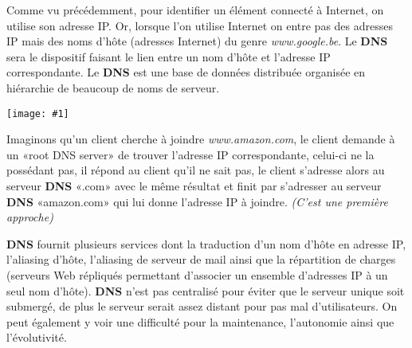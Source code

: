 \documentclass{article}
\newcommand{\imgR}[2]{\begin{center}\texttt{[image: \#1]}\end{center}}
\begin{document}
Comme vu précédemment, pour identifier un élément connecté à Internet, on utilise son adresse IP. Or, lorsque 
l'on utilise Internet on entre pas des adresses IP mais des noms d'hôte (adresses Internet) du genre 
\textit{www.google.be}. Le \textbf{DNS} sera le dispositif faisant le lien entre un nom d'hôte et l'adresse IP
correspondante. Le \textbf{DNS} est une base de données distribuée organisée en hiérarchie de beaucoup de noms
de serveur.

\imgR{CN_020.png}{300}

\noindent Imaginons qu'un client cherche à joindre \textit{www.amazon.com}, le client demande à un «root DNS 
server» de trouver l'adresse IP correspondante, celui-ci ne la possédant pas, il répond au client qu'il ne sait 
pas, le client s'adresse alors au serveur \textbf{DNS} «.com» avec le même résultat et finit par s'adresser au 
serveur \textbf{DNS} «amazon.com» qui lui donne l'adresse IP à joindre. \textit{(C'est une première approche)}

\textbf{DNS} fournit plusieurs services dont la traduction d'un nom d'hôte en adresse IP, l'aliasing d'hôte, 
l'aliasing de serveur de mail ainsi que la répartition de charges (serveurs Web répliqués permettant d'associer
un ensemble d'adresses IP à un seul nom d'hôte). \textbf{DNS} n'est pas centralisé pour éviter que le serveur
unique soit submergé, de plus le serveur serait assez distant pour pas mal d'utilisateurs. On peut également y 
voir une difficulté pour la maintenance, l'autonomie ainsi que l'évolutivité.
\end{document}
